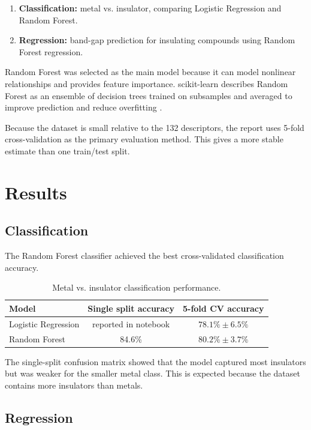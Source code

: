\documentclass[11pt,a4paper]{article}
\begin{document}
\begin{enumerate}
  \item \textbf{Classification:} metal vs. insulator, comparing Logistic Regression and Random Forest.
  \item \textbf{Regression:} band-gap prediction for insulating compounds using Random Forest regression.
\end{enumerate}

Random Forest was selected as the main model because it can model nonlinear relationships and provides feature importance. scikit-learn describes Random Forest as an ensemble of decision trees trained on subsamples and averaged to improve prediction and reduce overfitting \cite{sklearnrf}.

Because the dataset is small relative to the 132 descriptors, the report uses 5-fold cross-validation as the primary evaluation method. This gives a more stable estimate than one train/test split.

\section{Results}

\subsection{Classification}

The Random Forest classifier achieved the best cross-validated classification accuracy.

\begin{table}[H]
\centering
\caption{Metal vs. insulator classification performance.}
\begin{tabular}{lcc}
\toprule
Model & Single split accuracy & 5-fold CV accuracy \\
\midrule
Logistic Regression & reported in notebook & \(78.1\% \pm 6.5\%\) \\
Random Forest & 84.6\% & \(80.2\% \pm 3.7\%\) \\
\bottomrule
\end{tabular}
\end{table}

The single-split confusion matrix showed that the model captured most insulators but was weaker for the smaller metal class. This is expected because the dataset contains more insulators than metals.

\subsection{Regression}
\end{document}
